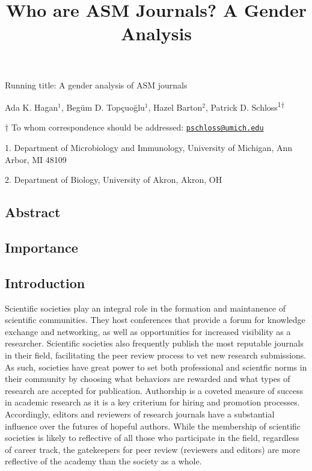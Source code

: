 \documentclass[11pt,]{article}
\title{\textbf{Who are ASM Journals? A Gender Analysis}}
\author{}
\date{}
\begin{document}
\maketitle

\vspace{35mm}

Running title: A gender analysis of ASM journals

\vspace{35mm}

Ada K. Hagan\({^1}\), Begüm D. Topçuoğlu\({^1}\), Hazel Barton\({^2}\),
Patrick D. Schloss\textsuperscript{1\(\dagger\)}

\vspace{40mm}

\(\dagger\) To whom correspondence should be addressed:
\href{mailto:pschloss@umich.edu}{\nolinkurl{pschloss@umich.edu}}

1. Department of Microbiology and Immunology, University of Michigan,
Ann Arbor, MI 48109

2. Department of Biology, University of Akron, Akron, OH

\newpage

\linenumbers

\subsection{Abstract}\label{abstract}

\subsection{Importance}\label{importance}

\subsection{Introduction}\label{introduction}

Scientific societies play an integral role in the formation and
maintanence of scientific communities. They host conferences that
provide a forum for knowledge exchange and networking, as well as
opportunities for increased visibility as a researcher. Scientific
societies also frequently publish the most reputable journals in their
field, facilitating the peer review process to vet new research
submissions. As such, societies have great power to set both
professional and scientfic norms in their community by choosing what
behaviors are rewarded and what types of research are accepted for
publication. Authorship is a coveted measure of success in academic
research as it is a key criterium for hiring and promotion processes.
Accordingly, editors and reviewers of research journals have a
substantial influence over the futures of hopeful authors. While the
membership of scientific societies is likely to reflective of all those
who participate in the field, regardless of career track, the
gatekeepers for peer review (reviewers and editors) are more reflective
of the academy than the society as a whole.
\end{document}
